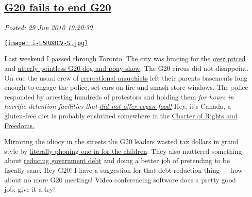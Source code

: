 %

\subsection*{\href{http://bakerjd99.wordpress.com/2010/06/29/g20-fails-to-end-g20/}{G20 fails to end G20}}


\noindent\emph{Posted: 29 Jun 2010 19:20:30}
\vspace{6pt}

\captionsetup[floatingfigure]{labelformat=empty}
\begin{floatingfigure}[l]{0.25\textwidth}
\centering
\href{http://www.jacketflap.com/megablog/index.asp?blogid=79}{\texttt{[image: i-L5RD8CV-S.jpg]}}
\label{fig:648X0}
\end{floatingfigure}Last
weekend I passed through Toronto. The city was bracing for the
\href{http://www.msnbc.msn.com/id/37901237/ns/world\_news-americas/}{over
priced} and
\href{http://blogs.the-american-interest.com/wrm/2010/06/25/pointless-g-20-summit-unfolds-in-toronto/}{utterly
pointless G20 dog and pony show}. The G20 circus did not disappoint. On
cue the usual crew of
\href{http://www.calgarysun.com/news/g20/2010/06/28/14549321.html}{recreational
anarchists} left their parents basements long enough to engage the
police, set cars on fire and smash store windows. The police responded
by arresting hundreds of protestors and holding them \emph{for hours in
horrific detention facilities that
\href{http://torontoist.com/2010/06/g20\_dispatches\_everyone\_loses.php}{did
not offer vegan food!}} Hey, it's Canada, a gluten-free diet is probably
enshrined somewhere in the
\href{http://laws.justice.gc.ca/en/charter/}{Charter of Rights and
Freedoms.}

Mirroring the idiocy in the streets the G20 leaders wasted tax dollars
in grand style by
\href{http://www.rhrealitycheck.org/blog/2010/06/29/roundup-promises-protestors-promoting-maternal-child-health}{literally
phoning one in for the children}. They also muttered something about
\href{http://nbbusinessjournal.canadaeast.com/front/article/1114209}{reducing
government debt} and doing a better job of pretending to be fiscally
sane. Hey G20! I have a suggestion for that debt reduction thing --- how
about no more G20 meetings! Video conferencing software does a pretty
good job; give it a try!


